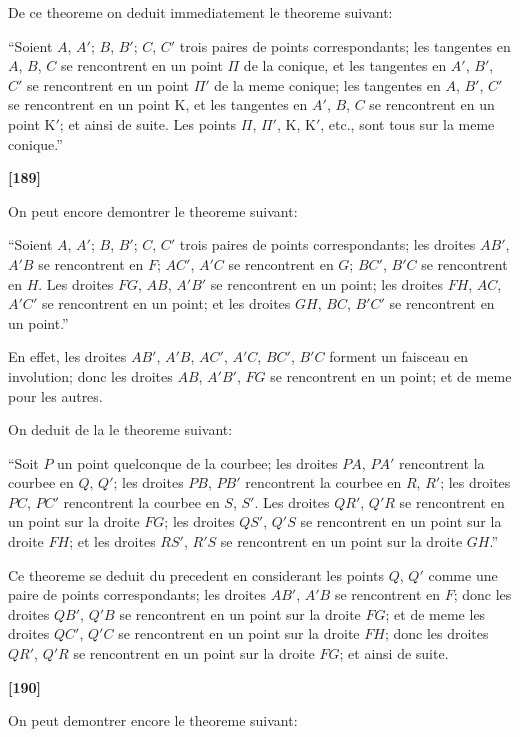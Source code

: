 \documentclass[11pt,a4paper]{book}
\begin{document}
De ce theoreme on deduit immediatement le theoreme suivant:

``Soient $A$, $A'$; $B$, $B'$; $C$, $C'$ trois paires de points correspondants; les tangentes
en $A$, $B$, $C$ se rencontrent en un point $\Pi$ de la conique, et les tangentes en $A'$, $B'$, $C'$
se rencontrent en un point $\Pi'$ de la meme conique; les tangentes en $A$, $B'$, $C'$ se
rencontrent en un point $\mathrm{K}$, et les tangentes en $A'$, $B$, $C$ se rencontrent en un point $\mathrm{K}'$;
et ainsi de suite. Les points $\Pi$, $\Pi'$, $\mathrm{K}$, $\mathrm{K}'$, etc., sont tous sur la meme conique.''

\textbf{[189]}

On peut encore demontrer le theoreme suivant:

``Soient $A$, $A'$; $B$, $B'$; $C$, $C'$ trois paires de points correspondants; les droites
$AB'$, $A'B$ se rencontrent en $F$; $AC'$, $A'C$ se rencontrent en $G$; $BC'$, $B'C$ se rencontrent
en $H$. Les droites $FG$, $AB$, $A'B'$ se rencontrent en un point; les droites $FH$, $AC$, $A'C'$
se rencontrent en un point; et les droites $GH$, $BC$, $B'C'$ se rencontrent en un point.''

En effet, les droites $AB'$, $A'B$, $AC'$, $A'C$, $BC'$, $B'C$ forment un faisceau en involution;
donc les droites $AB$, $A'B'$, $FG$ se rencontrent en un point; et de meme pour les autres.

On deduit de la le theoreme suivant:

``Soit $P$ un point quelconque de la courbee; les droites $PA$, $PA'$ rencontrent la
courbee en $Q$, $Q'$; les droites $PB$, $PB'$ rencontrent la courbee en $R$, $R'$; les droites $PC$,
$PC'$ rencontrent la courbee en $S$, $S'$. Les droites $QR'$, $Q'R$ se rencontrent en un point
sur la droite $FG$; les droites $QS'$, $Q'S$ se rencontrent en un point sur la droite $FH$; et
les droites $RS'$, $R'S$ se rencontrent en un point sur la droite $GH$.''

Ce theoreme se deduit du precedent en considerant les points $Q$, $Q'$ comme une
paire de points correspondants; les droites $AB'$, $A'B$ se rencontrent en $F$; donc les
droites $QB'$, $Q'B$ se rencontrent en un point sur la droite $FG$; et de meme les droites
$QC'$, $Q'C$ se rencontrent en un point sur la droite $FH$; donc les droites $QR'$, $Q'R$ se
rencontrent en un point sur la droite $FG$; et ainsi de suite.

\textbf{[190]}

On peut demontrer encore le theoreme suivant:
\end{document}
